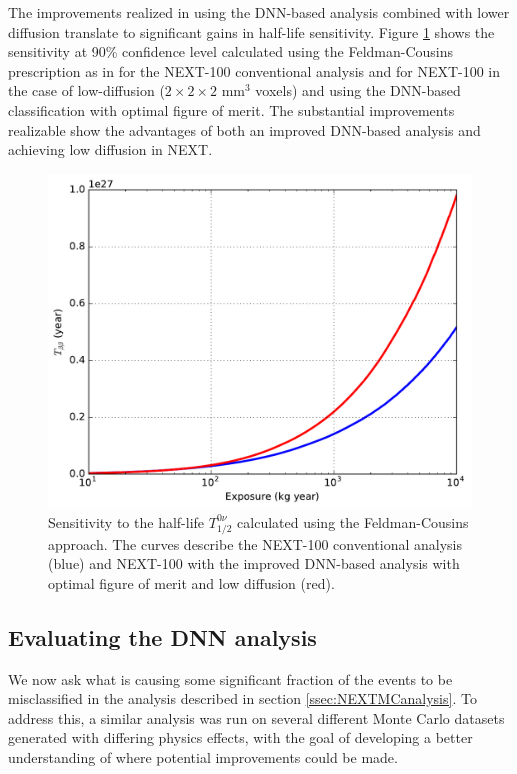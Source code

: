 \documentclass[a4paper,11pt]{article}
\begin{document}
The improvements realized in using the DNN-based analysis combined with lower diffusion translate to significant gains in half-life sensitivity.  Figure \ref{fig.halflife} shows the sensitivity at 90\% confidence level calculated using the Feldman-Cousins \cite{Feldman_1998} prescription as in \cite{NEXT_sensitivity} for the NEXT-100 conventional analysis and for NEXT-100 in the case of low-diffusion ($2 \times 2 \times 2$ mm$^3$ voxels) and using the DNN-based classification with optimal figure of merit. The substantial improvements realizable show the advantages of both an improved DNN-based analysis and achieving low diffusion in NEXT.

\begin{figure}[!htb]
	\centering
	\includegraphics[scale=0.55]{fig/half_life_sensitivity.pdf}
	\caption{\label{fig.halflife}Sensitivity to the half-life $T^{0\nu}_{1/2}$ calculated using the Feldman-Cousins approach.  The curves describe the NEXT-100 conventional analysis \cite{NEXT_sensitivity} (blue) and NEXT-100 with the improved DNN-based analysis with optimal figure of merit and low diffusion (red).}
\end{figure}

\subsection{Evaluating the DNN analysis}\label{ssec:DNNeval}
We now ask what is causing some significant fraction of the events to be misclassified in the analysis described in section \ref{ssec:NEXTMCanalysis}.  To address this, a similar analysis was run 
on several different Monte Carlo datasets generated with differing physics effects, with the goal of developing a better understanding of where potential improvements could be made.
\end{document}
